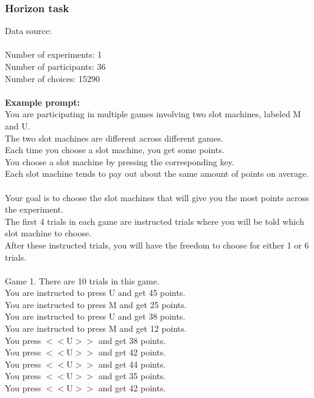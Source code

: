 \documentclass[pdflatex,sn-nature]{sn-jnl}%
\theoremstyle{thmstyleone}%
\theoremstyle{thmstyletwo}%
\theoremstyle{thmstylethree}%
\begin{document}
\subsubsection*{Horizon task}
Data source: \cite{waltz2020differential} \\ $~$ \\
Number of experiments: 1 $~$\\ 
Number of participants: 36 $~$\\ 
Number of choices: 15290 $~$\\ 
 $~$\\ 
\textbf{Example prompt:}
 $~$\\ 
You are participating in multiple games involving two slot machines, labeled M and U. $~$\\ 
The two slot machines are different across different games. $~$\\ 
Each time you choose a slot machine, you get some points. $~$\\ 
You choose a slot machine by pressing the corresponding key. $~$\\ 
Each slot machine tends to pay out about the same amount of points on average. $~$\\ 
Your goal is to choose the slot machines that will give you the most points across the experiment. $~$\\ 
The first 4 trials in each game are instructed trials where you will be told which slot machine to choose. $~$\\ 
After these instructed trials, you will have the freedom to choose for either 1 or 6 trials. $~$\\ 
 $~$\\ 
Game 1. There are 10 trials in this game. $~$\\ 
You are instructed to press U and get 45 points. $~$\\ 
You are instructed to press M and get 25 points. $~$\\ 
You are instructed to press U and get 38 points. $~$\\ 
You are instructed to press M and get 12 points. $~$\\ 
You press $<<$U$>>$ and get 38 points. $~$\\ 
You press $<<$U$>>$ and get 42 points. $~$\\ 
You press $<<$U$>>$ and get 44 points. $~$\\ 
You press $<<$U$>>$ and get 35 points. $~$\\ 
You press $<<$U$>>$ and get 42 points. $~$\\ 
\end{document}
